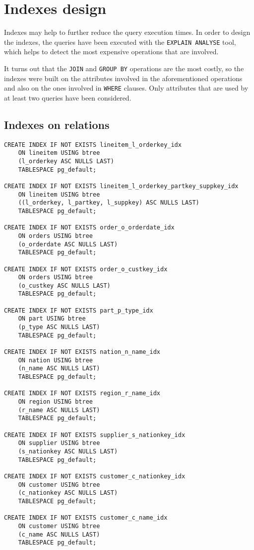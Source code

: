 

\section{Indexes design}

Indexes may help to further reduce the query execution times. In order to design the indexes, the queries have been executed with the \texttt{EXPLAIN ANALYSE} tool, which helps to detect the most expensive operations that are involved.

It turns out that the \texttt{JOIN} and \texttt{GROUP BY} operations are the most costly, so the indexes were built on the attributes involved in the aforementioned operations and also on the ones involved in \texttt{WHERE} clauses. Only attributes that are used by at least two queries have been considered.

\subsection{Indexes on relations}

\begin{lstlisting}CREATE INDEX IF NOT EXISTS lineitem_l_orderkey_idx
    ON lineitem USING btree
    (l_orderkey ASC NULLS LAST)
    TABLESPACE pg_default;

CREATE INDEX IF NOT EXISTS lineitem_l_orderkey_partkey_suppkey_idx
    ON lineitem USING btree
    ((l_orderkey, l_partkey, l_suppkey) ASC NULLS LAST)
    TABLESPACE pg_default;

CREATE INDEX IF NOT EXISTS order_o_orderdate_idx
    ON orders USING btree
    (o_orderdate ASC NULLS LAST)
    TABLESPACE pg_default;

CREATE INDEX IF NOT EXISTS order_o_custkey_idx
    ON orders USING btree
    (o_custkey ASC NULLS LAST)
    TABLESPACE pg_default;

CREATE INDEX IF NOT EXISTS part_p_type_idx
	ON part USING btree
	(p_type ASC NULLS LAST)
	TABLESPACE pg_default;

CREATE INDEX IF NOT EXISTS nation_n_name_idx
	ON nation USING btree
	(n_name ASC NULLS LAST)
	TABLESPACE pg_default;

CREATE INDEX IF NOT EXISTS region_r_name_idx
	ON region USING btree
	(r_name ASC NULLS LAST)
	TABLESPACE pg_default;

CREATE INDEX IF NOT EXISTS supplier_s_nationkey_idx
	ON supplier USING btree
	(s_nationkey ASC NULLS LAST)
	TABLESPACE pg_default;

CREATE INDEX IF NOT EXISTS customer_c_nationkey_idx
	ON customer USING btree
	(c_nationkey ASC NULLS LAST)
	TABLESPACE pg_default;

CREATE INDEX IF NOT EXISTS customer_c_name_idx
	ON customer USING btree
	(c_name ASC NULLS LAST)
	TABLESPACE pg_default;
\end{lstlisting}

